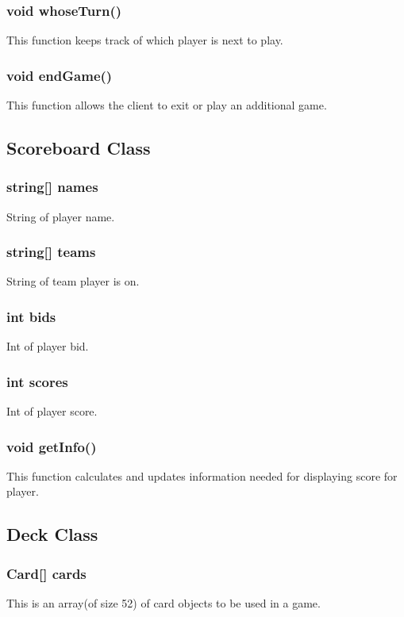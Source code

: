\subsubsection
        {
          void whoseTurn()
        }
        This function keeps track of which player is next to play.
\subsubsection
        {
          void endGame()
        }
        This function allows the client to exit or
          play an additional game.

\subsection
        {
          Scoreboard Class
        }

        \subsubsection
        {
          string[] names
        }
        String of player name.
\subsubsection
        {
          string[] teams
        }
        String of team player is on.
\subsubsection
        {
          int bids
        }
        Int of player bid.
\subsubsection
        {
          int scores
        }
        Int of player score.
\subsubsection
        {
          void getInfo()
        }
        This function calculates and updates information needed for displaying score for player.

\subsection
        {
          Deck Class
        }

        \subsubsection
        {
          Card[] cards
        }
        This is an array(of size 52) of card objects to be used in a game.
